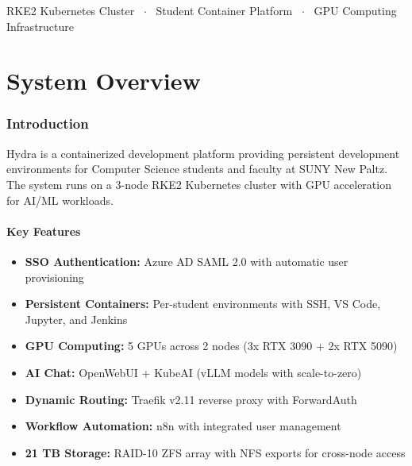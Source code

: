 \documentclass[11pt,a4paper]{article}
\begin{document}

\begin{center}
\end{center}

\vspace{0.5em}
{\centering\large
  RKE2 Kubernetes Cluster ~$\cdot$~
  Student Container Platform ~$\cdot$~
  GPU Computing Infrastructure\par}
\vspace{1em}

\tableofcontents
\newpage

\part{System Overview}

\section{Introduction}

Hydra is a containerized development platform providing persistent development environments for Computer Science students and faculty at SUNY New Paltz. The system runs on a 3-node RKE2 Kubernetes cluster with GPU acceleration for AI/ML workloads.

\subsection{Key Features}
\begin{itemize}
    \item \textbf{SSO Authentication:} Azure AD SAML 2.0 with automatic user provisioning
    \item \textbf{Persistent Containers:} Per-student environments with SSH, VS Code, Jupyter, and Jenkins
    \item \textbf{GPU Computing:} 5 GPUs across 2 nodes (3x RTX 3090 + 2x RTX 5090)
    \item \textbf{AI Chat:} OpenWebUI + KubeAI (vLLM models with scale-to-zero)
    \item \textbf{Dynamic Routing:} Traefik v2.11 reverse proxy with ForwardAuth
    \item \textbf{Workflow Automation:} n8n with integrated user management
    \item \textbf{21 TB Storage:} RAID-10 ZFS array with NFS exports for cross-node access
\end{itemize}
\end{document}
